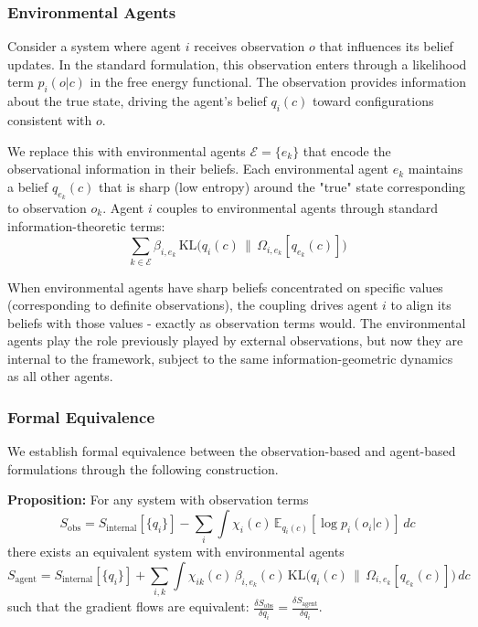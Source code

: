 \documentclass[11pt]{article}
\begin{document}
\subsubsection{Environmental Agents}

Consider a system where agent $i$ receives observation $o$ that influences its belief updates. In the standard formulation, this observation enters through a likelihood term $p_i(o|c)$ in the free energy functional. The observation provides information about the true state, driving the agent's belief $q_i(c)$ toward configurations consistent with $o$.

We replace this with environmental agents $\mathcal{E} = \{e_k\}$ that encode the observational information in their beliefs. Each environmental agent $e_k$ maintains a belief $q_{e_k}(c)$ that is sharp (low entropy) around the "true" state corresponding to observation $o_k$. Agent $i$ couples to environmental agents through standard information-theoretic terms:
\begin{equation}
\sum_{k \in \mathcal{E}} \beta_{i,e_k} \, \mathrm{KL}\big(q_i(c) \,\|\, \Omega_{i,e_k}[q_{e_k}(c)]\big)
\end{equation}

When environmental agents have sharp beliefs concentrated on specific values (corresponding to definite observations), the coupling drives agent $i$ to align its beliefs with those values - exactly as observation terms would. The environmental agents play the role previously played by external observations, but now they are internal to the framework, subject to the same information-geometric dynamics as all other agents.

\subsubsection{Formal Equivalence}

We establish formal equivalence between the observation-based and agent-based formulations through the following construction.

\textbf{Proposition:} For any system with observation terms
\begin{equation}
S_{\text{obs}} = S_{\text{internal}}[\{q_i\}] - \sum_i \int \chi_i(c) \, \mathbb{E}_{q_i(c)}[\log p_i(o_i|c)] \, dc
\end{equation}
there exists an equivalent system with environmental agents
\begin{equation}
S_{\text{agent}} = S_{\text{internal}}[\{q_i\}] + \sum_{i,k} \int \chi_{ik}(c) \, \beta_{i,e_k}(c) \, \mathrm{KL}\big(q_i(c) \,\|\, \Omega_{i,e_k}[q_{e_k}(c)]\big) \, dc
\end{equation}
such that the gradient flows are equivalent: $\frac{\delta S_{\text{obs}}}{\delta q_i} = \frac{\delta S_{\text{agent}}}{\delta q_i}$.
\end{document}
